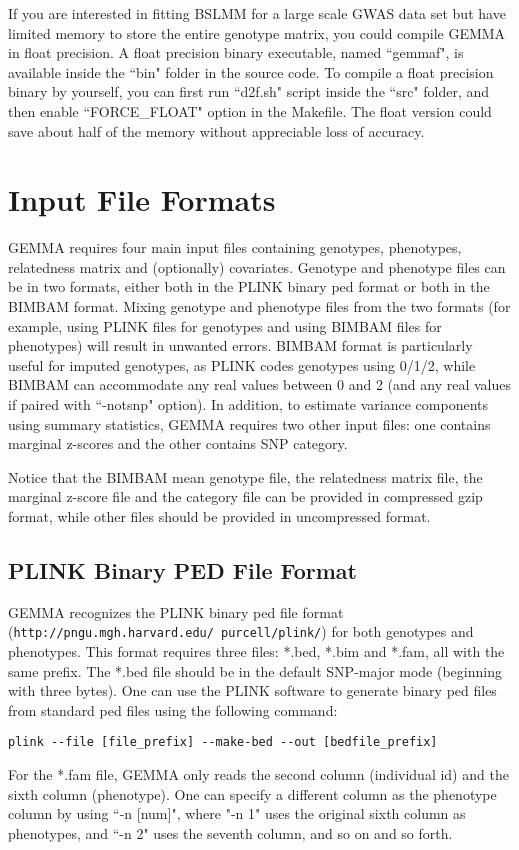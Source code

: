 \documentclass[11pt]{article}
\providecommand{\url}[1]{\texttt{#1}}
\begin{document}
If you are interested in fitting BSLMM for a large scale GWAS data set
but have limited memory to store the entire genotype matrix, you could
compile GEMMA in float precision. A float precision binary executable,
named ``gemmaf", is available inside the ``bin" folder in the source
code. To compile a float precision binary by yourself, you can first
run ``d2f.sh" script inside the ``src" folder, and then enable
``FORCE\_FLOAT" option in the Makefile. The float version could save
about half of the memory without appreciable loss of accuracy.

\newpage

\section{Input File Formats}

GEMMA requires four main input files containing genotypes, phenotypes,
relatedness matrix and (optionally) covariates. Genotype and phenotype
files can be in two formats, either both in the PLINK binary ped
format or both in the BIMBAM format. Mixing genotype and phenotype
files from the two formats (for example, using PLINK files for
genotypes and using BIMBAM files for phenotypes) will result in
unwanted errors. BIMBAM format is particularly useful for imputed
genotypes, as PLINK codes genotypes using 0/1/2, while BIMBAM can
accommodate any real values between 0 and 2 (and any real values if
paired with ``-notsnp" option). In addition, to estimate variance
components using summary statistics, GEMMA requires two other input
files: one contains marginal z-scores and the other contains SNP
category.

Notice that the BIMBAM mean genotype file, the relatedness matrix
file, the marginal z-score file and the category file can be provided
in compressed gzip format, while other files should be provided in
uncompressed format.

\subsection{PLINK Binary PED File Format}

GEMMA recognizes the PLINK binary ped file format
(\url{http://pngu.mgh.harvard.edu/~purcell/plink/})
\cite{Purcell:2007} for both genotypes and phenotypes. This format
requires three files: *.bed, *.bim and *.fam, all with the same
prefix. The *.bed file should be in the default SNP-major mode
(beginning with three bytes). One can use the PLINK software to
generate binary ped files from standard ped files using the following
command:
%
\begin{verbatim}
plink --file [file_prefix] --make-bed --out [bedfile_prefix]
\end{verbatim}
%
For the *.fam file, GEMMA only reads the second column (individual id)
and the sixth column (phenotype). One can specify a different column
as the phenotype column by using ``-n [num]", where "-n 1" uses the
original sixth column as phenotypes, and ``-n 2" uses the seventh
column, and so on and so forth.
\end{document}

